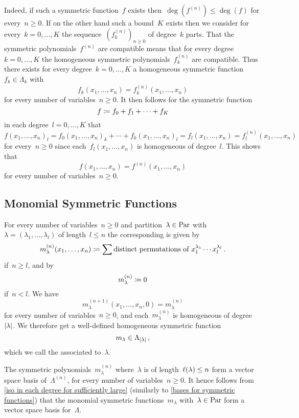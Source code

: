 \documentclass[a4paper,11pt]{scrartcl}
\begin{document}
Indeed, if such a symmetric function~$f$ exists then~$\deg( f^{(n)} ) \leq \deg(f)$ for every~$n \geq 0$.
If on the other hand such a bound~$K$ exists then we consider for every~$k = 0, \dotsc, K$ the sequence~$( f^{(n)}_k )_{n \geq 0}$ of degree~$k$ parts.
That the symmetric polynomials~$f^{(n)}$ are compatible means that for every degree~$k = 0, \dotsc, K$ the homogeneous symmetric polynomials~$f^{(n)}_k$ are compatible.
Thus there exists for every degree~$k = 0, \dotsc, K$ a homogeneous symmetric function~$f_k \in \Lambda_k$ with
\[
f_k(x_1, \dots, x_n)
=
f^{(n)}_k(x_1, \dotsc, x_n)
\]
for every number of variables~$n \geq 0$.
It then follows for the symmetric function
\[
f
\coloneqq
f_0 + f_1 + \dotsb + f_K
\]
in each degree~$l = 0, \dotsc, K$ that
\[
f(x_1, \dotsc, x_n)_l
=
f_0(x_1, \dotsc, x_n)_k
+
\dotsb
+
f_k(x_1, \dotsc, x_n)_l
=
f_l(x_1, \dotsc, x_n)
=
f^{(n)}_l(x_1, \dotsc, x_n)
\]
for every~$n \geq 0$ since each~$f_l(x_1, \dotsc, x_n)$ is homogeneous of degree~$l$.
This shows that
\[
f(x_1, \dotsc, x_n)
=
f^{(n)}(x_1, \dotsc, x_n)
\]
for every number of variables~$n \geq 0$.



\subsection{Monomial Symmetric Functions}
\label{monomial symmetric functions}

For every number of variables~$n \geq 0$ and partition~$\lambda \in \mathrm{Par}$ with~$\lambda = (\lambda_1, \dotsc, \lambda_l)$ of length~$l \leq n$ the corresponding  is given by
\[
  m^{(n)}_\lambda(x_1, \dotsc, x_n)
  \coloneqq
  \sum \text{distinct permutations of~$x_1^{\lambda_1} \dotsm x_l^{\lambda_l}$} \,.
\]
if~$n \geq l$, and by
\[
  m^{(n)}_\lambda
  \coloneqq
  0
\]
if~$n < l$.
We have
\[
  m^{(n+1)}_\lambda(x_1, \dotsc, x_n, 0)
  =
  m^{(n)}_\lambda
\]
for every number of variables~$n \geq 0$, and each~$m_\lambda^{(n)}$ is homogeneous of degree~$\lvert\lambda\rvert$.
We therefore get a well-defined homogeneous symmetric function
\[
  m_\lambda
  \in
  \Lambda_{\lvert\lambda\rvert} \,,
\]
which we call the  associated to~$\lambda$.

The symmetric polynomials~$m^{(n)}_\lambda$ where~$\lambda$ is of length~$\ell(\lambda) \leq n$ form a vector space basis of~$\Lambda^{(n)}$, for every number of variables~$n \geq 0$.
It hence follows from \cref{iso in each degree for sufficiently large} (similarly to \cref{bases for symmetric functions}) that the monomial symmetric functions~$m_\lambda$ with~$\lambda \in \mathrm{Par}$ form a vector space basis for~$\Lambda$.
\end{document}
